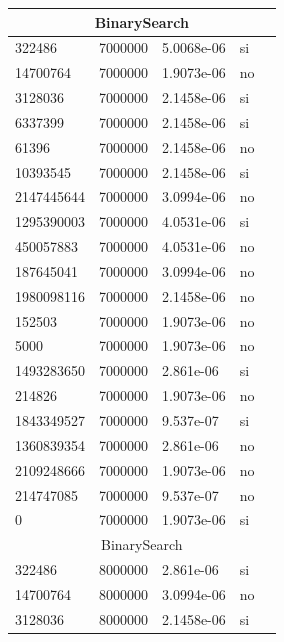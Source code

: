 \documentclass[12pt, fleqn]{article}                             %
\theoremstyle{break}                                            %
\begin{document}
\begin{longtable}{|m{5em}|m{5em}|m{10em}|m{5em}|@{}m{0pt}@{}}
            \multicolumn{5}{|c|}{BinarySearch}   \\          \hline
            322486& 7000000  & 5.0068e-06 & si &\\[1em]    \hline
            14700764& 7000000  & 1.9073e-06 & no &\\[1em]    \hline
            3128036& 7000000  & 2.1458e-06 & si &\\[1em]    \hline
            6337399& 7000000  & 2.1458e-06 & si &\\[1em]    \hline
            61396& 7000000  & 2.1458e-06 & no &\\[1em]    \hline
            10393545& 7000000  & 2.1458e-06 & si &\\[1em]    \hline
            2147445644& 7000000  & 3.0994e-06 & no &\\[1em]    \hline
            1295390003& 7000000  & 4.0531e-06 & si &\\[1em]    \hline
            450057883& 7000000  & 4.0531e-06 & no &\\[1em]    \hline
            187645041& 7000000  & 3.0994e-06 & no &\\[1em]    \hline
            1980098116& 7000000  & 2.1458e-06 & no &\\[1em]    \hline
            152503& 7000000  & 1.9073e-06 & no &\\[1em]    \hline
            5000& 7000000  & 1.9073e-06 & no &\\[1em]    \hline
            1493283650& 7000000  & 2.861e-06 & si &\\[1em]    \hline
            214826& 7000000  & 1.9073e-06 & no &\\[1em]    \hline
            1843349527& 7000000  & 9.537e-07 & si &\\[1em]    \hline
            1360839354& 7000000  & 2.861e-06 & no &\\[1em]    \hline
            2109248666& 7000000  & 1.9073e-06 & no &\\[1em]    \hline
            214747085& 7000000  & 9.537e-07 & no &\\[1em]    \hline
            0& 7000000  & 1.9073e-06 & si &\\[1em]    \hline
            \multicolumn{5}{|c|}{BinarySearch}   \\          \hline
            322486& 8000000  & 2.861e-06 & si &\\[1em]    \hline
            14700764& 8000000  & 3.0994e-06 & no &\\[1em]    \hline
            3128036& 8000000  & 2.1458e-06 & si &\\[1em]    \hline

\end{longtable}
\end{document}
